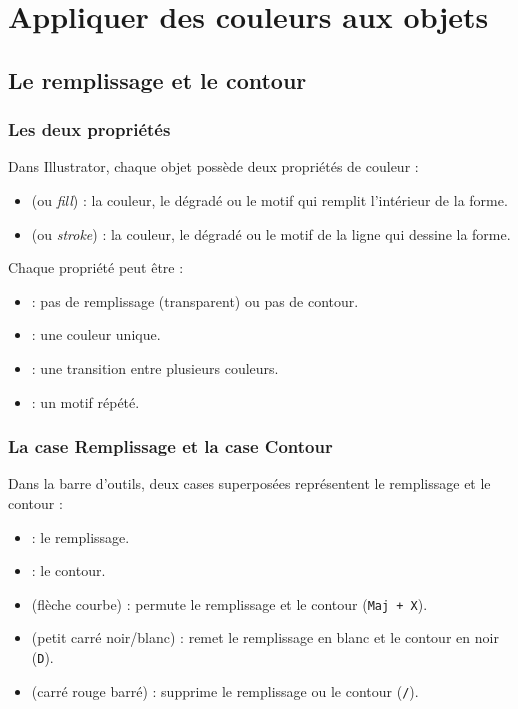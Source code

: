 \section{Appliquer des couleurs aux objets}

\subsection{Le remplissage et le contour}

\subsubsection{Les deux propriétés}

Dans Illustrator, chaque objet possède deux propriétés de couleur :

\begin{itemize}
    \item {} (ou \emph{fill}) : la couleur, le dégradé ou le motif qui remplit l'intérieur de la forme.
    \item {} (ou \emph{stroke}) : la couleur, le dégradé ou le motif de la ligne qui dessine la forme.
\end{itemize}

Chaque propriété peut être :

\begin{itemize}
    \item {} : pas de remplissage (transparent) ou pas de contour.
    \item {} : une couleur unique.
    \item {} : une transition entre plusieurs couleurs.
    \item {} : un motif répété.
\end{itemize}

\subsubsection{La case Remplissage et la case Contour}

Dans la barre d'outils, deux cases superposées représentent le remplissage et le contour :

\begin{itemize}
    \item {} : le remplissage.
    \item {} : le contour.
    \item {} (flèche courbe) : permute le remplissage et le contour (\texttt{Maj + X}).
    \item {} (petit carré noir/blanc) : remet le remplissage en blanc et le contour en noir (\texttt{D}).
    \item {} (carré rouge barré) : supprime le remplissage ou le contour (\texttt{/}).
\end{itemize}

